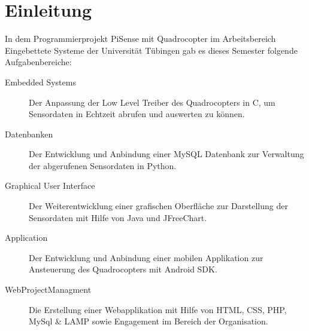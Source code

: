 \documentclass[fleqn,10pt]{SelfArx} %
\begin{document}
\flushbottom %

\maketitle %

\tableofcontents %

\thispagestyle{empty} %


\section*{Einleitung} %


In dem Programmierprojekt PiSense mit Quadrocopter im Arbeitsbereich Eingebettete Systeme der Universität Tübingen gab es dieses Semester folgende Aufgabenbereiche:

\begin{description}
\item[Embedded Systems]
Der Anpassung der Low Level Treiber des Quadrocopters in C, um Sensordaten in Echtzeit abrufen und auswerten zu können.

\item[Datenbanken] Der Entwicklung und Anbindung einer MySQL Datenbank zur Verwaltung der abgerufenen Sensordaten in Python.
 
\item[Graphical User Interface] Der Weiterentwicklung einer grafischen Oberfläche zur Darstellung der Sensordaten mit Hilfe von Java und JFreeChart.

\item[Application] Der Entwicklung und Anbindung einer mobilen Applikation zur Ansteuerung des Quadrocopters mit Android SDK.

\item[WebProjectManagment] Die Erstellung einer Webapplikation mit Hilfe von HTML, CSS, PHP, MySql & LAMP sowie Engagement im Bereich der Organisation.
 
\end{description}
\end{document}
